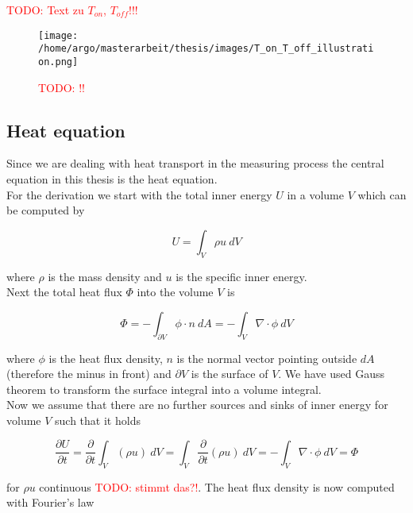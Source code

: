 \documentclass{scrartcl}[12pt, halfparskip]
\numberwithin{equation}{section}
\numberwithin{figure}{section}
\numberwithin{table}{section}
\newcommand{\todo}[1]{\textcolor{red}{TODO: #1}}
\begin{document}
\todo{Text zu $T_{on}$, $T_{off}$!!!}

\begin{figure}[H]
	\centering
	\texttt{[image: /home/argo/masterarbeit/thesis/images/T\_on\_T\_off\_illustration.png]}
	\caption{\todo{!!}}
	\label{fig:T_on/off_illustration}
\end{figure}




\subsection{Heat equation}
\label{sec:heat_equation}

Since we are dealing with heat transport in the measuring process the central equation in this thesis is the heat equation. \\
For the derivation \cite{lit:waerme_und_stoffuebertragung}
we start with the total inner energy $U$ in a volume $V$ which can be computed by

\begin{equation}
	U = \int_{V} \rho u \ dV
\end{equation}

where $\rho$ is the mass density and $u$ is the specific inner energy. \\
Next the total heat flux $\varPhi$ into the volume $V$ is

\begin{equation}
	\varPhi = - \int_{\partial V} \phi \cdot n \ dA = - \int_{V} \nabla \cdot \phi \ dV
\end{equation}

where $\phi$ is the heat flux density, $n$ is the normal vector pointing outside $dA$ (therefore the minus in front) and $\partial V$ is the surface of $V$. We have used Gauss theorem to transform the surface integral into a volume integral. \\
Now we assume that there are no further sources and sinks of inner energy for volume $V$ such that it holds

\begin{equation}
	\frac{\partial U}{\partial t} = \frac{\partial}{\partial t} \int_V (\rho u) \ dV = \int_V \frac{\partial}{\partial t}(\rho u) \ dV = - \int_{V} \nabla \cdot \phi \ dV = \varPhi
	\label{eq:heat_eq_derivation_1}
\end{equation}

for $\rho u$ continuous \todo{stimmt das?!}. The heat flux density is now computed with Fourier's law
\end{document}
